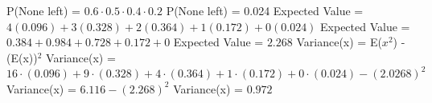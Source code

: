 \documentclass{article}
\begin{document}
	P(None left) = $0.6\cdot0.5\cdot0.4\cdot0.2$
	\newline
	P(None left) = 0.024
	\newline
	\newline
	Expected Value = $4(0.096)+3(0.328)+2(0.364)+1(0.172)+0(0.024)$
	\newline
	Expected Value = $0.384+0.984+0.728+0.172+0$
	\newline
	Expected Value = $2.268$
	\newline
	\newline
	Variance(x) = E($x^2$) - (E(x))$^2$
	\newline
	Variance(x) =$ 16\cdot(0.096) + 9\cdot(0.328) + 4\cdot(0.364) + 1\cdot(0.172) + 0\cdot(0.024) - (2.0268)^2$
	\newline
	Variance(x) = $6.116-(2.268)^2$
	\newline
	Variance(x) = $0.972$
\end{document}
